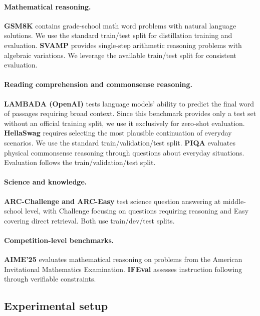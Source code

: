 \documentclass[11pt]{article}
\begin{document}
\paragraph{Mathematical reasoning.}
\textbf{GSM8K} \citep{cobbe2021gsm8k} contains grade-school math word problems with natural language solutions. We use the standard train/test split for distillation training and evaluation.
\textbf{SVAMP} \citep{patel2021svamp} provides single-step arithmetic reasoning problems with algebraic variations. We leverage the available train/test split for consistent evaluation.

\paragraph{Reading comprehension and commonsense reasoning.}
\textbf{LAMBADA (OpenAI)} \citep{paperno2016lambada} tests language models' ability to predict the final word of passages requiring broad context. Since this benchmark provides only a test set without an official training split, we use it exclusively for zero-shot evaluation.
\textbf{HellaSwag} \citep{zellers2019hellaswag} requires selecting the most plausible continuation of everyday scenarios. We use the standard train/validation/test split.
\textbf{PIQA} \citep{bisk2019piqa} evaluates physical commonsense reasoning through questions about everyday situations. Evaluation follows the train/validation/test split.

\paragraph{Science and knowledge.}
\textbf{ARC-Challenge and ARC-Easy} \citep{clark2018arc} test science question answering at middle-school level, with Challenge focusing on questions requiring reasoning and Easy covering direct retrieval. Both use train/dev/test splits.

\paragraph{Competition-level benchmarks.}
\textbf{AIME'25} evaluates mathematical reasoning on problems from the American Invitational Mathematics Examination.
\textbf{IFEval} \citep{zhou2023ifeval} assesses instruction following through verifiable constraints.

\subsection{Experimental setup}
\end{document}
